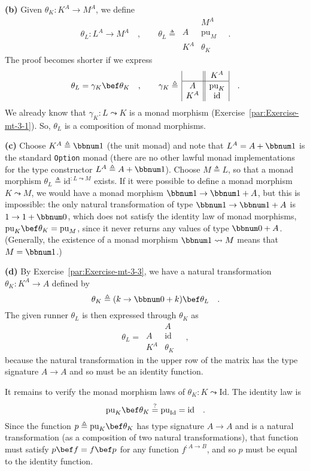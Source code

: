 \textbf{(b)} Given $\theta_{K}:K^{A}\rightarrow M^{A}$, we define
\[
\theta_{L}:L^{A}\rightarrow M^{A}\quad,\quad\quad\theta_{L}\triangleq\,\begin{array}{|c||c|}
 & M^{A}\\
\hline A & \text{pu}_{M}\\
K^{A} & \theta_{K}
\end{array}\quad.
\]
The proof becomes shorter if we express 
\[
\theta_{L}=\gamma_{K}\bef\theta_{K}\quad,\quad\quad\gamma_{K}\triangleq\,\begin{array}{|c||c|}
 & K^{A}\\
\hline A & \text{pu}_{K}\\
K^{A} & \text{id}
\end{array}\quad.
\]
We already know that $\gamma_{K}:L\leadsto K$ is a monad morphism
(Exercise~\ref{par:Exercise-mt-3-1}). So, $\theta_{L}$ is a composition
of monad morphisms.

\textbf{(c)} Choose $K^{A}\triangleq\bbnum 1$ (the unit monad) and
note that $L^{A}=A+\bbnum 1$ is the standard \lstinline!Option!
monad (there are no other lawful monad implementations for the type
constructor $L^{A}\triangleq A+\bbnum 1$). Choose $M\triangleq L$,
so that a monad morphism $\theta_{L}\triangleq\text{id}^{:L\leadsto M}$
exists. If it were possible to define a monad morphism $K\leadsto M$,
we would have a monad morphism $\bbnum 1\rightarrow\bbnum 1+A$, but
this is impossible: the only natural transformation of type $\bbnum 1\rightarrow\bbnum 1+A$
is $1\rightarrow1+\bbnum 0$, which does not satisfy the identity
law of monad morphisms, $\text{pu}_{K}\bef\theta_{K}=\text{pu}_{M}$,
since it never returns any values of type $\bbnum 0+A$. (Generally,
the existence of a monad morphism $\bbnum 1\leadsto M$ means that
$M=\bbnum 1$.)

\textbf{(d)} By Exercise~\ref{par:Exercise-mt-3-3}, we have a natural
transformation $\theta_{K}:K^{A}\rightarrow A$ defined by 
\[
\theta_{K}\triangleq(k\rightarrow\bbnum 0+k)\bef\theta_{L}\quad.
\]
The given runner $\theta_{L}$ is then expressed through $\theta_{K}$
as
\[
\theta_{L}=\,\begin{array}{|c||c|}
 & A\\
\hline A & \text{id}\\
K^{A} & \theta_{K}
\end{array}\quad,
\]
because the natural transformation in the upper row of the matrix
has the type signature $A\rightarrow A$ and so must be an identity
function.

It remains to verify the monad morphism laws of $\theta_{K}:K\leadsto\text{Id}$.
The identity law is
\[
\text{pu}_{K}\bef\theta_{K}\overset{?}{=}\text{pu}_{\text{Id}}=\text{id}\quad.
\]
 Since the function $p\triangleq\text{pu}_{K}\bef\theta_{K}$ has
type signature $A\rightarrow A$ and is a natural transformation (as
a composition of two natural transformations), that function must
satisfy $p\bef f=f\bef p$ for any function $f^{:A\rightarrow B}$,
and so $p$ must be equal to the identity function.

